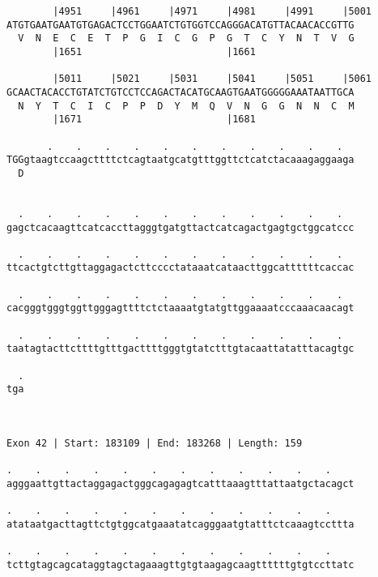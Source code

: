 \documentclass{article}
\begin{document}
\begin{Verbatim}
        |4951     |4961     |4971     |4981     |4991     |5001
ATGTGAATGAATGTGAGACTCCTGGAATCTGTGGTCCAGGGACATGTTACAACACCGTTG
  V  N  E  C  E  T  P  G  I  C  G  P  G  T  C  Y  N  T  V  G
        |1651                         |1661                 
  
        |5011     |5021     |5031     |5041     |5051     |5061
GCAACTACACCTGTATCTGTCCTCCAGACTACATGCAAGTGAATGGGGGAAATAATTGCA
  N  Y  T  C  I  C  P  P  D  Y  M  Q  V  N  G  G  N  N  C  M
        |1671                         |1681                 
  
       .    .    .    .    .    .    .    .    .    .    .  
TGGgtaagtccaagcttttctcagtaatgcatgtttggttctcatctacaaagaggaaga
  D                                                         
                                                            
  
  .    .    .    .    .    .    .    .    .    .    .    .  
gagctcacaagttcatcaccttagggtgatgttactcatcagactgagtgctggcatccc
                                                            
  .    .    .    .    .    .    .    .    .    .    .    .  
ttcactgtcttgttaggagactcttcccctataaatcataacttggcattttttcaccac
                                                            
  .    .    .    .    .    .    .    .    .    .    .    .  
cacgggtgggtggttgggagttttctctaaaatgtatgttggaaaatcccaaacaacagt
                                                            
  .    .    .    .    .    .    .    .    .    .    .    .  
taatagtacttcttttgtttgacttttgggtgtatctttgtacaattatatttacagtgc
                                                            
  .
tga
   
   
 
Exon 42 | Start: 183109 | End: 183268 | Length: 159
 
.    .    .    .    .    .    .    .    .    .    .    .    
agggaattgttactaggagactgggcagagagtcatttaaagtttattaatgctacagct
                                                            
.    .    .    .    .    .    .    .    .    .    .    .    
atataatgacttagttctgtggcatgaaatatcagggaatgtatttctcaaagtccttta
                                                            
.    .    .    .    .    .    .    .    .    .    .    .    
tcttgtagcagcataggtagctagaaagttgtgtaagagcaagttttttgtgtccttatc
                                                            

\end{Verbatim}
\end{document}
